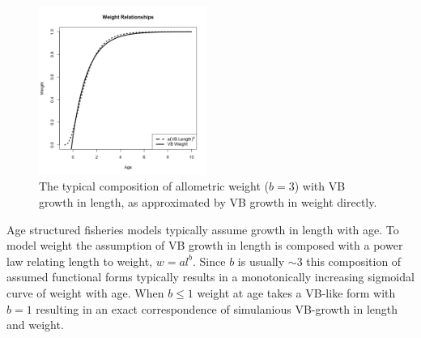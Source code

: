%
\begin{figure} %
\vspace{-1.5cm}
\includegraphics[width=0.49\textwidth]{plots/vbOpt.png}
\vspace{-1cm}
\caption{
The typical composition of allometric weight ($b=3$) with VB growth in length, as
approximated by VB growth in weight directly.
}
\label{vbComp}
\end{figure}

%
Age structured fisheries models typically assume %
\cite[VB]{von_bertalanffy_quantitative_1938} growth in length with age. To model
weight the assumption of VB growth in length is composed with a power law 
relating length to weight, $w=al^b$. 
%
Since $b$ is usually $\sim3$ this composition of assumed functional forms
typically results in a monotonically increasing sigmoidal curve of weight with age.
When $b\le1$ weight at age takes a VB-like form with $b=1$ resulting in
an exact correspondence of simulanious VB-growth in length and weight.

